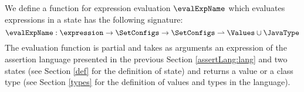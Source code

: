 
 

%
%                                                     
%                                          
%                                       

 
We define a function for expression evaluation
 $\evalExpName$ which evaluates expressions in a state has the following signature:
$$
\evalExpName : \expression \rightarrow \SetConfigs  \rightarrow \SetConfigs  \rightharpoonup  \Values \cup \JavaType
$$
The evaluation function is partial and  takes as arguments an expression of the assertion language presented in the previous Section 
\ref{assertLang:lang} and two states (see Section \ref{def} for the definition of state)  and returns a value or a class type
(see Section \ref{types} for the definition of values and types in the language). 


